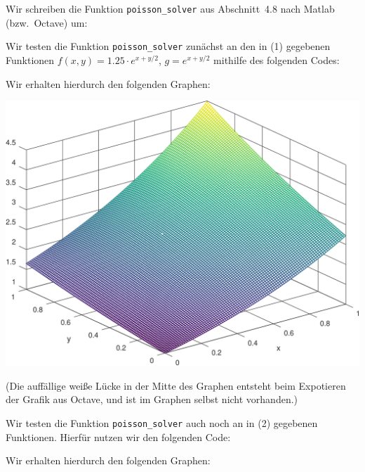 \section{}

Wir schreiben die Funktion \texttt{poisson\_solver} aus Abschnitt~4.8 nach Matlab (bzw.\ Octave) um:



Wir testen die Funktion \texttt{poisson\_solver} zunächst an den in (1) gegebenen Funktionen $f(x,y) = 1.25 \cdot e^{x + y/2}$, $g = e^{x + y/2}$ mithilfe des folgenden Codes:



Wir erhalten hierdurch den folgenden Graphen:

\begin{center}
  \includegraphics[width = \textwidth]{chapter_08/exercise_08_42_figure_1.pdf}
\end{center}

(Die auffällige weiße Lücke in der Mitte des Graphen entsteht beim Expotieren der Grafik aus Octave, und ist im Graphen selbst nicht vorhanden.)

Wir testen die Funktion \texttt{poisson\_solver} auch noch an in (2) gegebenen Funktionen.
Hierfür nutzen wir den folgenden Code:



Wir erhalten hierdurch den folgenden Graphen:

